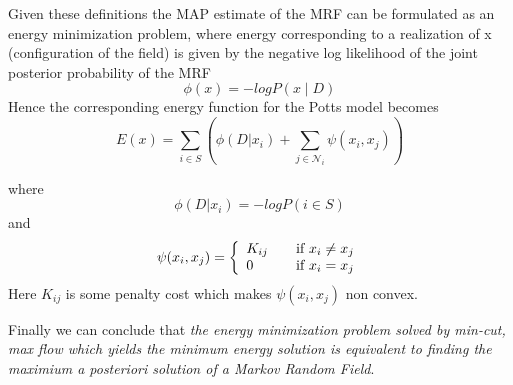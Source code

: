 Given these definitions the MAP estimate of the MRF can be formulated as an energy minimization problem, where energy corresponding to a realization of x (configuration of the field) is given by the negative log likelihood of the joint posterior probability of the MRF
\[
\phi(x) = -logP(x\mid D)
\]
Hence the corresponding energy function for the Potts model becomes 
\[
E(x) =  \underset{i\in S}{\operatorname{\sum}} \left(\phi(D|x_i) + \underset{j\in \mathcal{N}_i}{\operatorname{\sum}}\psi(x_i,x_j) \right)
\]

where 
\[
\phi(D|x_i)  = -logP(i\in S)
\]
 and 
 \[
 \psi(x_i,x_j) = \left\{ 
  \begin{array}{l l}
    K_{ij} & \quad \text{if $x_i \neq x_j$}\\
    0 & \quad \text{if $x_i = x_j$}
  \end{array} \right.
 \]
 Here $K_{ij}$ is some penalty cost which makes $\psi(x_i,x_j)$ non convex.

 Finally we can conclude that {\it the energy minimization problem solved by min-cut, max flow which yields the minimum energy solution is equivalent to finding the maximium a posteriori solution of a Markov Random Field}.
 
